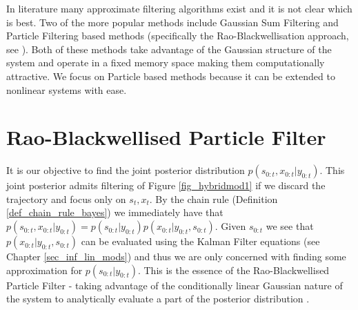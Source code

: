 In literature many approximate filtering algorithms exist and it is not clear which is best. Two of the more popular methods include Gaussian Sum Filtering \cite{barber2} and Particle Filtering based methods (specifically the Rao-Blackwellisation approach, see \cite{chen}\cite{doucet}). Both of these methods take advantage of the Gaussian structure of the system and operate in a fixed memory space making them computationally attractive. We focus on Particle based methods because it can be extended to nonlinear systems with ease.   

\section{Rao-Blackwellised Particle Filter}
It is our objective to find the joint posterior distribution $p(s_{0:t}, x_{0:t}|y_{0:t})$. This joint posterior admits filtering of Figure \ref{fig_hybridmod1} if we discard the trajectory and focus only on $s_t,x_t$. By the chain rule (Definition \ref{def_chain_rule_bayes}) we immediately have that $p(s_{0:t}, x_{0:t}|y_{0:t}) = p(s_{0:t}|y_{0:t})p(x_{0:t}|y_{0:t}, s_{0:t})$. Given $s_{0:t}$ we see that $p(x_{0:t}|y_{0:t}, s_{0:t})$ can be evaluated using the Kalman Filter equations (see Chapter \ref{sec_inf_lin_mods}) and thus we are only concerned with finding some approximation for $p(s_{0:t}|y_{0:t})$. This is the essence of the Rao-Blackwellised Particle Filter - taking advantage of the conditionally linear Gaussian nature of the system to analytically evaluate a part of the posterior distribution \cite{doucet}.

